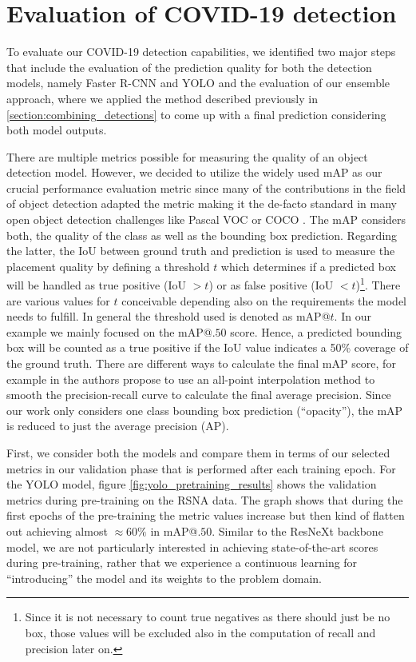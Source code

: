\section{Evaluation of COVID-19 detection}\label{chapter:eval_rcnn_yolo}

To evaluate our COVID-19 detection capabilities, we identified two major steps that include the evaluation of the prediction quality for both the detection models, namely Faster \ac{R-CNN} and \ac{YOLO} and the evaluation of our ensemble approach, where we applied the method described previously in \ref{section:combining_detections} to come up with a final prediction considering both model outputs. 

There are multiple metrics possible for measuring the quality of an object detection model. However, we decided to utilize the widely used \acf{mAP} as our crucial performance evaluation metric since many of the contributions in the field of object detection adapted the metric making it the de-facto standard in many open object detection challenges like Pascal VOC \autocite{everingham2010pascal} or COCO \autocite{coco}. The \ac{mAP} considers both, the quality of the class as well as the bounding box prediction. Regarding the latter, the \ac{IoU} between ground truth and prediction is used to measure the placement quality by defining a threshold $t$ which determines if a predicted box will be handled as true positive (\ac{IoU} $> t$) or as false positive (\ac{IoU} $< t$)\footnote{Since it is not necessary to count true negatives as there should just be no box, those values will be excluded also in the computation of recall and precision later on.}. There are various values for $t$ conceivable depending also on the requirements the model needs to fulfill. In general the threshold used is denoted as \ac{mAP}@$t$. In our example we mainly focused on the \ac{mAP}@$.50$ score. Hence, a predicted bounding box will be counted as a true positive if the \ac{IoU} value indicates a 50\% coverage of the ground truth. There are different ways to calculate the final \ac{mAP} score, for example in \autocite{padilla2020survey} the authors propose to use an all-point interpolation method to smooth the precision-recall curve to calculate the final average precision. Since our work only considers one class bounding box prediction (\enquote{opacity}), the \ac{mAP} is reduced to just the average precision (AP).

First, we consider both the models and compare them in terms of our selected metrics in our validation phase that is performed after each training epoch.
For the \ac{YOLO} model, figure \ref{fig:yolo_pretraining_results} shows the validation metrics during pre-training on the \ac{RSNA} data. The graph shows that during the first epochs of the pre-training the metric values increase but then kind of flatten out achieving almost $\approx60\%$ in \ac{mAP}@$.50$. Similar to the ResNeXt backbone model, we are not particularly interested in achieving state-of-the-art scores during pre-training, rather that we experience a continuous learning for \enquote{introducing} the model and its weights to the problem domain.

